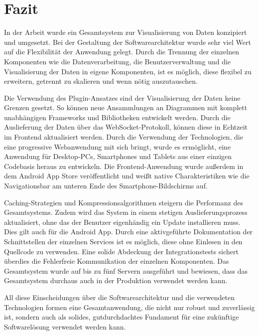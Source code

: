 \chapter{Fazit}
\label{chap:fazit}

In der Arbeit wurde ein Gesamtsystem zur Visualisierung von Daten konzipiert und
umgesetzt. Bei der Gestaltung der Softwarearchitektur wurde sehr viel Wert auf
die Flexibilität der Anwendung gelegt. Durch die Trennung der einzelnen Komponenten
wie die Datenverarbeitung, die Benutzerverwaltung und die Visualisierung der Daten
in eigene Komponenten, ist es möglich, diese flexibel zu erweitern,
getrennt zu skalieren und wenn nötig auszutauschen. 

Die Verwendung des Plugin-Ansatzes sind der Visualisierung der Daten keine Grenzen gesetzt.
So können neue Ansammlungen an Diagrammen mit komplett unabhängigen Frameworks und
Bibliotheken entwickelt werden. Durch die Auslieferung der Daten über
das WebSocket-Protokoll, können diese in Echtzeit im Frontend aktualisiert werden.
Durch die Verwendung der Technologien, die eine progressive Webanwendung mit sich bringt,
wurde es ermöglicht, eine Anwendung für Desktop-PCs, Smartphones und Tablets aus einer einzigen
Codebasis heraus zu entwickeln. Die Frontend-Anwendung wurde außerdem in dem Android App Store
veröffentlicht und weißt native Charakteristiken wie die Navigationsbar am unteren
Ende des Smartphone-Bildschirms auf. 

Caching-Strategien und Kompressionsalgorithmen steigern die Performanz des Gesamtsystems.
Zudem wird das System in einem stetigen Auslieferungsprozess aktualisiert, ohne das
der Benutzer eigenhändig ein Update installieren muss. Dies gilt auch für die Android App.
Durch eine aktivgeführte Dokumentation der Schnittstellen der einzelnen Services
ist es möglich, diese ohne Einlesen in den Quellcode zu verwenden. Eine solide Abdeckung der Integrationstests sichert überdies die
Fehlerfreie Kommunikation der einzelnen Komponenten. Das Gesamtsystem wurde auf bis zu
fünf Servern ausgeführt und bewiesen, dass das Gesamtsystem durchaus auch in der Produktion
verwendet werden kann.

All diese Einscheidungen über die Softwarearchitektur und die verwendeten Technologien
formen eine Gesamtanwendung, die nicht nur robust und zuverlässig ist, sondern auch
als solides, gutdurchdachtes Fundament für eine zukünftige Softwarelösung
verwendet werden kann.
